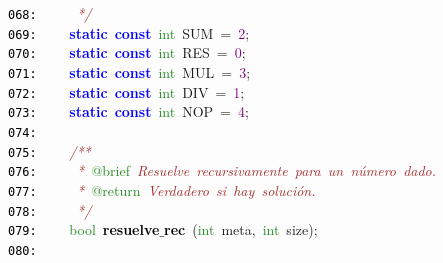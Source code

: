\documentclass[a4paper,10pt]{scrartcl}
\begin{document}
{   \mbox{}\texttt{\textcolor{Black}{068:}} \textit{\textcolor{Brown}{\ \ \ \ \ */}} \\
   \mbox{}\texttt{\textcolor{Black}{069:}} \ \ \ \ \textbf{\textcolor{Blue}{static}}\ \textbf{\textcolor{Blue}{const}}\ \textcolor{ForestGreen}{int}\ SUM\ \textcolor{BrickRed}{=}\ \textcolor{Purple}{2}\textcolor{BrickRed}{;} \\
   \mbox{}\texttt{\textcolor{Black}{070:}} \ \ \ \ \textbf{\textcolor{Blue}{static}}\ \textbf{\textcolor{Blue}{const}}\ \textcolor{ForestGreen}{int}\ RES\ \textcolor{BrickRed}{=}\ \textcolor{Purple}{0}\textcolor{BrickRed}{;} \\
   \mbox{}\texttt{\textcolor{Black}{071:}} \ \ \ \ \textbf{\textcolor{Blue}{static}}\ \textbf{\textcolor{Blue}{const}}\ \textcolor{ForestGreen}{int}\ MUL\ \textcolor{BrickRed}{=}\ \textcolor{Purple}{3}\textcolor{BrickRed}{;} \\
   \mbox{}\texttt{\textcolor{Black}{072:}} \ \ \ \ \textbf{\textcolor{Blue}{static}}\ \textbf{\textcolor{Blue}{const}}\ \textcolor{ForestGreen}{int}\ DIV\ \textcolor{BrickRed}{=}\ \textcolor{Purple}{1}\textcolor{BrickRed}{;} \\
   \mbox{}\texttt{\textcolor{Black}{073:}} \ \ \ \ \textbf{\textcolor{Blue}{static}}\ \textbf{\textcolor{Blue}{const}}\ \textcolor{ForestGreen}{int}\ NOP\ \textcolor{BrickRed}{=}\ \textcolor{Purple}{4}\textcolor{BrickRed}{;} \\
   \mbox{}\texttt{\textcolor{Black}{074:}} \ \  \\
   \mbox{}\texttt{\textcolor{Black}{075:}} \ \ \ \ \textit{\textcolor{Brown}{/**}} \\
   \mbox{}\texttt{\textcolor{Black}{076:}} \textit{\textcolor{Brown}{\ \ \ \ \ *\ }}\textcolor{ForestGreen}{@brief}\textit{\textcolor{Brown}{\ Resuelve\ recursivamente\ para\ un\ número\ dado.}} \\
   \mbox{}\texttt{\textcolor{Black}{077:}} \textit{\textcolor{Brown}{\ \ \ \ \ *\ }}\textcolor{ForestGreen}{@return}\textit{\textcolor{Brown}{\ Verdadero\ si\ hay\ solución.}} \\
   \mbox{}\texttt{\textcolor{Black}{078:}} \textit{\textcolor{Brown}{\ \ \ \ \ */}} \\
   \mbox{}\texttt{\textcolor{Black}{079:}} \ \ \ \ \textcolor{ForestGreen}{bool}\ \textbf{\textcolor{Black}{resuelve$\_$rec}}\ \textcolor{BrickRed}{(}\textcolor{ForestGreen}{int}\ meta\textcolor{BrickRed}{,}\ \textcolor{ForestGreen}{int}\ size\textcolor{BrickRed}{);} \\
   \mbox{}\texttt{\textcolor{Black}{080:}} \ \  \\
}
\end{document}
